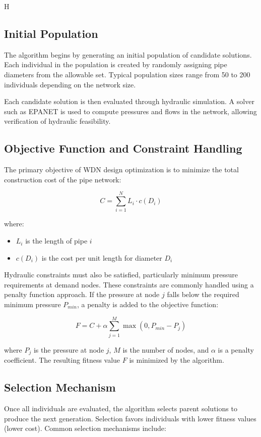 H\documentclass[12pt, a4paper]{article}
\begin{document}
\subsection*{Initial Population}

The algorithm begins by generating an initial population of candidate solutions. Each individual in the population is created by randomly assigning pipe diameters from the allowable set. Typical population sizes range from 50 to 200 individuals depending on the network size.

Each candidate solution is then evaluated through hydraulic simulation. A solver such as EPANET is used to compute pressures and flows in the network, allowing verification of hydraulic feasibility.

\subsection*{Objective Function and Constraint Handling}

The primary objective of WDN design optimization is to minimize the total construction cost of the pipe network:

\[
C = \sum_{i=1}^{N} L_i \cdot c(D_i)
\]

where:
\begin{itemize}
\item $L_i$ is the length of pipe $i$
\item $c(D_i)$ is the cost per unit length for diameter $D_i$
\end{itemize}

Hydraulic constraints must also be satisfied, particularly minimum pressure requirements at demand nodes. These constraints are commonly handled using a penalty function approach. If the pressure at node $j$ falls below the required minimum pressure $P_{min}$, a penalty is added to the objective function:

\[
F = C + \alpha \sum_{j=1}^{M} \max(0, P_{min} - P_j)
\]

where $P_j$ is the pressure at node $j$, $M$ is the number of nodes, and $\alpha$ is a penalty coefficient. The resulting fitness value $F$ is minimized by the algorithm.

\subsection*{Selection Mechanism}

Once all individuals are evaluated, the algorithm selects parent solutions to produce the next generation. Selection favors individuals with lower fitness values (lower cost). Common selection mechanisms include:
\end{document}
